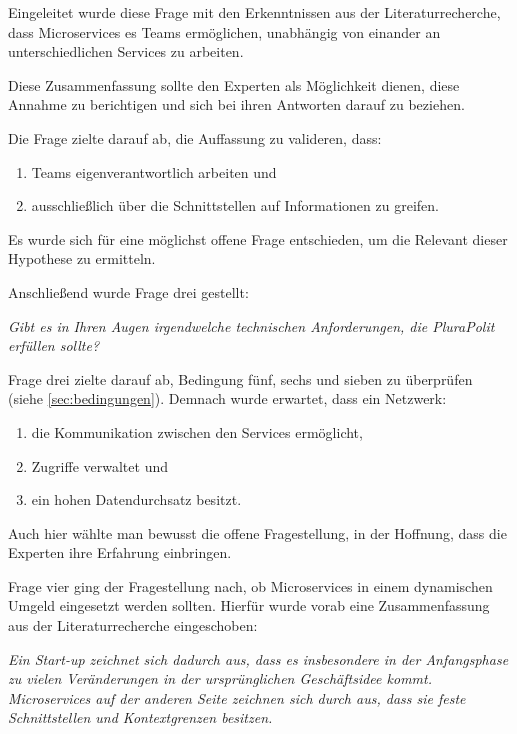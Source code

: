 Eingeleitet wurde diese Frage mit den Erkenntnissen aus der Literaturrecherche, dass Microservices es Teams ermöglichen, unabhängig von einander an unterschiedlichen Services zu arbeiten.

Diese Zusammenfassung sollte den Experten als Möglichkeit dienen, diese Annahme zu berichtigen und sich bei ihren Antworten darauf zu beziehen.

Die Frage zielte darauf ab, die Auffassung zu valideren, dass:
\begin{enumerate}
	\item Teams eigenverantwortlich arbeiten und
	\item ausschließlich über die Schnittstellen auf Informationen zu greifen.
\end{enumerate}
Es wurde sich für eine möglichst offene Frage entschieden, um die Relevant dieser Hypothese zu ermitteln.


Anschließend wurde Frage drei gestellt:

\textit{Gibt es in Ihren Augen irgendwelche technischen Anforderungen, die PluraPolit erfüllen sollte? }

Frage drei zielte darauf ab, Bedingung fünf, sechs und sieben zu überprüfen (siehe \cref{sec:bedingungen}). Demnach wurde erwartet, dass ein Netzwerk: 

\begin{enumerate}
	\item die Kommunikation zwischen den Services ermöglicht,
	\item Zugriffe verwaltet und
	\item ein hohen Datendurchsatz besitzt.
\end{enumerate}

Auch hier wählte man bewusst die offene Fragestellung, in der Hoffnung, dass die Experten ihre Erfahrung einbringen.

Frage vier ging der Fragestellung nach, ob Microservices in einem dynamischen Umgeld eingesetzt werden sollten. Hierfür wurde vorab eine Zusammenfassung aus der Literaturrecherche eingeschoben:

\textit{Ein Start-up zeichnet sich dadurch aus, dass es insbesondere in der Anfangsphase zu vielen Veränderungen in der ursprünglichen Geschäftsidee kommt. Microservices auf der anderen Seite zeichnen sich durch aus, dass sie feste Schnittstellen und Kontextgrenzen besitzen.}

